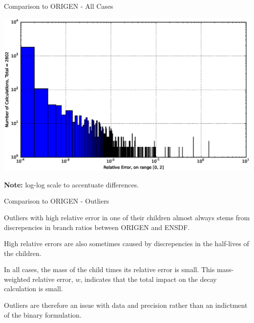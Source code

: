 \documentclass[xcolor=x11names,compress]{beamer}
\begin{document}
\begin{frame}{Comparison to ORIGEN - All Cases}

    \begin{center}
    \includegraphics[scale=0.45]{decay-relative-error-histogram.eps}
    \end{center}

    \vspace*{-1em}
    \textbf{Note:} log-log scale to accentuate differences.

\end{frame}


\begin{frame}{Comparison to ORIGEN - Outliers}

    Outliers with high relative error in one of their children almost always
    stems from discrepencies in branch ratios between ORIGEN and ENSDF.

    \vspace*{1em}
    High relative errors are also sometimes caused by discrepencies in the 
    half-lives of the children.

    \vspace*{1em}
    In all cases, the mass of the child times its relative error is small.
    This mass-weighted relative error, $w$,  indicates that the total impact 
    on the decay calculation is small.

    \vspace*{1em}
    Outliers are therefore an issue with data and precision rather than 
    an indictment of the binary formulation.

\end{frame}
\end{document}
